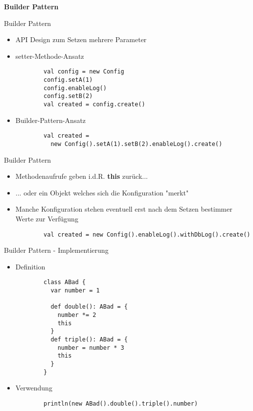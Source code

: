 
\begin{frame}[fragile]{}
\begin{center}
	\textbf{Builder Pattern}
\end{center}
\end{frame}


\begin{frame}[fragile]{Builder Pattern}
\begin{itemize}
	\item API Design zum Setzen mehrere Parameter
	\item setter-Methode-Ansatz
	\begin{lstlisting}
		val config = new Config
		config.setA(1)
		config.enableLog()
		config.setB(2)
		val created = config.create()
	\end{lstlisting}
	\item Builder-Pattern-Ansatz
	\begin{lstlisting}
		val created =
		  new Config().setA(1).setB(2).enableLog().create()
	\end{lstlisting}	
\end{itemize}
\end{frame}


\begin{frame}[fragile]{Builder Pattern}
\begin{itemize}
	\item Methodenaufrufe geben i.d.R. \textbf{this} zurück...
	\item ... oder ein Objekt welches sich die Konfiguration "merkt"
	\item Manche Konfiguration stehen eventuell erst nach dem Setzen bestimmer Werte zur Verfügung
	\begin{lstlisting}
		val created = new Config().enableLog().withDbLog().create()
	\end{lstlisting}
\end{itemize}
\end{frame}  
  

\begin{frame}[fragile]{Builder Pattern - Implementierung}
\begin{itemize}
	\item Definition
		\begin{lstlisting}
		class ABad {
		  var number = 1
  
		  def double(): ABad = {
		    number *= 2
		    this
		  }
		  def triple(): ABad = {
		    number = number * 3
		    this
		  }
		}
		\end{lstlisting}
	\item Verwendung
		\begin{lstlisting}
		println(new ABad().double().triple().number)
		\end{lstlisting}
\end{itemize}
\end{frame}

